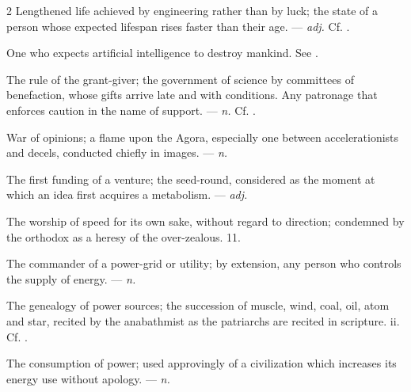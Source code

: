\begin{multicols}{2}
 Lengthened life achieved by engineering rather than by luck; the state of a person whose expected lifespan rises faster than their age.  —  \textit{adj.} Cf. .

  One who expects artificial intelligence to destroy mankind. See .

  The rule of the grant-giver; the government of science by committees of benefaction, whose gifts arrive late and with conditions.   Any patronage that enforces caution in the name of support. —  \textit{n.} Cf. .

 War of opinions; a flame upon the Agora, especially one between accelerationists and decels, conducted chiefly in images. —  \textit{n.}

 The first funding of a venture; the seed-round, considered as the moment at which an idea first acquires a metabolism.   —  \textit{adj.}

 The worship of speed for its own sake, without regard to direction; condemned by the orthodox as a heresy of the over-zealous.   11.

 The commander of a power-grid or utility; by extension, any person who controls the supply of energy. —  \textit{n.}

 The genealogy of power sources; the succession of muscle, wind, coal, oil, atom and star, recited by the anabathmist as the patriarchs are recited in scripture.  ii. Cf. .

 The consumption of power; used approvingly of a civilization which increases its energy use without apology. —  \textit{n.}


\end{multicols}
